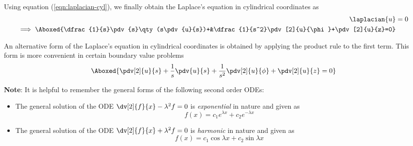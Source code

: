         Using equation (\ref{eqn:laplacian-cyl}), we finally obtain the Laplace's equation in cylindrical coordinates as
        \begin{align*}
            \laplacian{u}&=0 \\
            \implies\Aboxed{\dfrac{1}{s}\pdv{s}\qty(s\pdv{u}{s})+&\dfrac{1}{s^2}\pdv[2]{u}{\phi}+\pdv[2]{u}{z}=0}
        \end{align*}

        An alternative form of the Laplace's equation in cylindrical coordinates is obtained by applying the product rule to the first term. This form is more convenient in certain boundary value problems
        \begin{align*}
            \Aboxed{\pdv[2]{u}{s}+\dfrac{1}{s}\pdv{u}{s}+\dfrac{1}{s^2}\pdv[2]{u}{\phi}+\pdv[2]{u}{z}=0}
        \end{align*}

    \textbf{Note}: It is helpful to remember the general forms of the following second order ODEs:
    \begin{itemize}
        \item The general solution of the ODE $\dv[2]{f}{x}-\lambda^2f=0$ is \textit{exponential} in nature and given as
        $$f(x)=c_1e^{\lambda x}+c_2e^{-\lambda x}$$
        \item The general solution of the ODE $\dv[2]{f}{x}+\lambda^2f=0$ is \textit{harmonic} in nature and given as
        $$f(x)=c_1\cos{\lambda x}+c_2\sin{\lambda x}$$
    \end{itemize}

